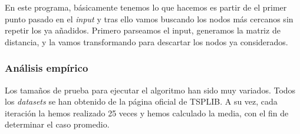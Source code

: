 \documentclass[10pt,a4paper]{article}
\begin{document}
En este programa, básicamente tenemos lo que hacemos es partir de el primer punto pasado en el \textit{input} y tras ello vamos buscando los nodos más cercanos sin repetir los ya añadidos. Primero parseamos el input, generamos la matriz de distancia, y la vamos transformando para descartar los nodos ya considerados. 

\subsubsection*{Análisis empírico}
Los tamaños de prueba para ejecutar el algoritmo han sido muy variados. Todos los \textit{datasets} se han obtenido de la página oficial de TSPLIB. A su vez, cada iteración la hemos realizado 25 veces y hemos calculado la media, con el fin de determinar el caso promedio.
\end{document}
